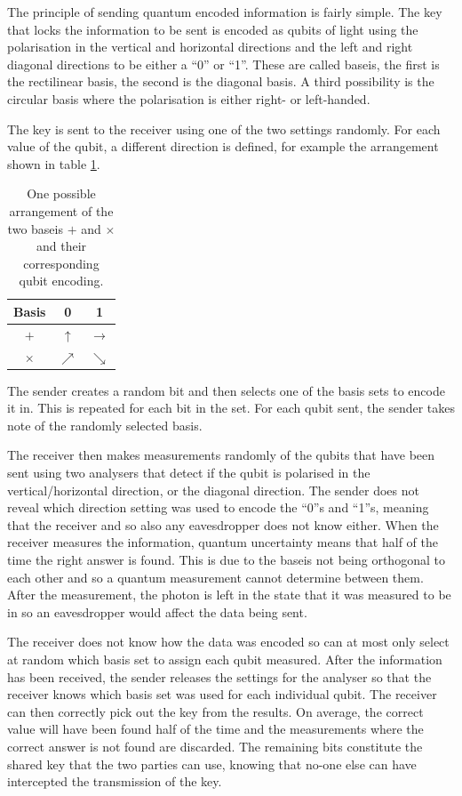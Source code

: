 The principle of sending quantum encoded information is fairly simple. The key that locks the information to be sent is encoded as qubits of light using the polarisation in the vertical and horizontal directions and the left and right diagonal directions to be either a ``0'' or ``1''. These are called baseis, the first is the rectilinear basis, the second is the diagonal basis. A third possibility is the circular basis where the polarisation is either right- or left-handed.

The key is sent to the receiver using one of the two settings randomly. For each value of the qubit, a different direction is defined, for example the arrangement shown in table \ref{tab:basis}.
\begin{table}[h!t]
	\centering
	\begin{tabular}{c|c|c}
		Basis & 0 & 1 \\ \hline
		$+$ & $\uparrow$ & $\rightarrow$ \\
		$\times$ & $\nearrow$ & $\searrow$
	\end{tabular}
	\caption{\label{tab:basis}One possible arrangement of the two baseis $+$ and $\times$ and their corresponding qubit encoding.}
\end{table}

The sender creates a random bit and then selects one of the basis sets to encode it in. This is repeated for each bit in the set. For each qubit sent, the sender takes note of the randomly selected basis.

The receiver then makes measurements randomly of the qubits that have been sent using two analysers that detect if the qubit is polarised in the vertical/horizontal direction, or the diagonal direction. The sender does not reveal which direction setting was used to encode the ``0''s and ``1''s, meaning that the receiver and so also any eavesdropper does not know either. When the receiver measures the information, quantum uncertainty means that half of the time the right answer is found. This is due to the baseis not being orthogonal to each other and so a quantum measurement cannot determine between them. After the measurement, the photon is left in the state that it was measured to be in so an eavesdropper would affect the data being sent. 

The receiver does not know how the data was encoded so can at most only select at random which basis set to assign each qubit measured. After the information has been received, the sender releases the settings for the analyser so that the receiver knows which basis set was used for each individual qubit. The receiver can then correctly pick out the key from the results. On average, the correct value will have been found half of the time and the measurements where the correct answer is not found are discarded. The remaining bits constitute the shared key that the two parties can use, knowing that no-one else can have intercepted the transmission of the key.

